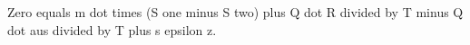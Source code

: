 Zero equals m dot times (S one minus S two) plus Q dot R divided by T minus Q dot aus divided by T plus s epsilon z.